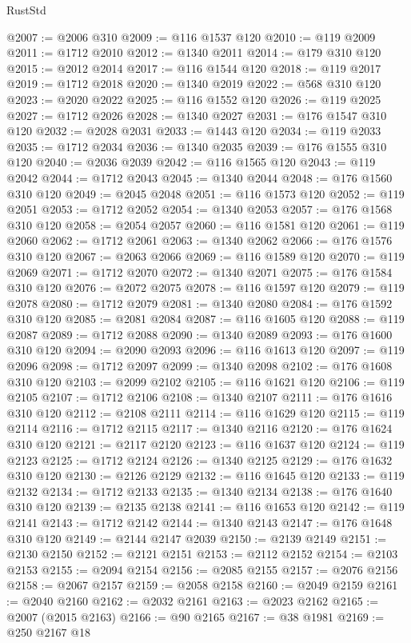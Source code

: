 \begin{lexlean}{RustStd}
\begin{coremodule}
@2007 := @2006 @310
@2009 := @116 @1537 @120
@2010 := @119 @2009
@2011 := @1712 @2010
@2012 := @1340 @2011
@2014 := @179 @310 @120
@2015 := @2012 @2014
@2017 := @116 @1544 @120
@2018 := @119 @2017
@2019 := @1712 @2018
@2020 := @1340 @2019
@2022 := @568 @310 @120
@2023 := @2020 @2022
@2025 := @116 @1552 @120
@2026 := @119 @2025
@2027 := @1712 @2026
@2028 := @1340 @2027
@2031 := @176 @1547 @310 @120
@2032 := @2028 @2031
@2033 := @1443 @120
@2034 := @119 @2033
@2035 := @1712 @2034
@2036 := @1340 @2035
@2039 := @176 @1555 @310 @120
@2040 := @2036 @2039
@2042 := @116 @1565 @120
@2043 := @119 @2042
@2044 := @1712 @2043
@2045 := @1340 @2044
@2048 := @176 @1560 @310 @120
@2049 := @2045 @2048
@2051 := @116 @1573 @120
@2052 := @119 @2051
@2053 := @1712 @2052
@2054 := @1340 @2053
@2057 := @176 @1568 @310 @120
@2058 := @2054 @2057
@2060 := @116 @1581 @120
@2061 := @119 @2060
@2062 := @1712 @2061
@2063 := @1340 @2062
@2066 := @176 @1576 @310 @120
@2067 := @2063 @2066
@2069 := @116 @1589 @120
@2070 := @119 @2069
@2071 := @1712 @2070
@2072 := @1340 @2071
@2075 := @176 @1584 @310 @120
@2076 := @2072 @2075
@2078 := @116 @1597 @120
@2079 := @119 @2078
@2080 := @1712 @2079
@2081 := @1340 @2080
@2084 := @176 @1592 @310 @120
@2085 := @2081 @2084
@2087 := @116 @1605 @120
@2088 := @119 @2087
@2089 := @1712 @2088
@2090 := @1340 @2089
@2093 := @176 @1600 @310 @120
@2094 := @2090 @2093
@2096 := @116 @1613 @120
@2097 := @119 @2096
@2098 := @1712 @2097
@2099 := @1340 @2098
@2102 := @176 @1608 @310 @120
@2103 := @2099 @2102
@2105 := @116 @1621 @120
@2106 := @119 @2105
@2107 := @1712 @2106
@2108 := @1340 @2107
@2111 := @176 @1616 @310 @120
@2112 := @2108 @2111
@2114 := @116 @1629 @120
@2115 := @119 @2114
@2116 := @1712 @2115
@2117 := @1340 @2116
@2120 := @176 @1624 @310 @120
@2121 := @2117 @2120
@2123 := @116 @1637 @120
@2124 := @119 @2123
@2125 := @1712 @2124
@2126 := @1340 @2125
@2129 := @176 @1632 @310 @120
@2130 := @2126 @2129
@2132 := @116 @1645 @120
@2133 := @119 @2132
@2134 := @1712 @2133
@2135 := @1340 @2134
@2138 := @176 @1640 @310 @120
@2139 := @2135 @2138
@2141 := @116 @1653 @120
@2142 := @119 @2141
@2143 := @1712 @2142
@2144 := @1340 @2143
@2147 := @176 @1648 @310 @120
@2149 := @2144 @2147 @2039
@2150 := @2139 @2149
@2151 := @2130 @2150
@2152 := @2121 @2151
@2153 := @2112 @2152
@2154 := @2103 @2153
@2155 := @2094 @2154
@2156 := @2085 @2155
@2157 := @2076 @2156
@2158 := @2067 @2157
@2159 := @2058 @2158
@2160 := @2049 @2159
@2161 := @2040 @2160
@2162 := @2032 @2161
@2163 := @2023 @2162
@2165 := @2007 (@2015 @2163)
@2166 := @90 @2165
@2167 := @38 @1981
@2169 := @250 @2167 @18

\end{coremodule}
\end{lexlean}
